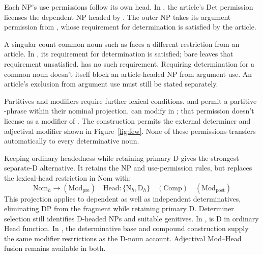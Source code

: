 \documentclass[12pt]{article}
\begin{document}
Each NP's use permissions follow its own head. In , the article's Det permission licenses the dependent NP headed by . The outer NP takes its argument permission from , whose requirement for determination is satisfied by the article.

A singular count common noun such as  faces a different restriction from an article. In , its requirement for determination is satisfied; bare  leaves that requirement unsatisfied.  has no such requirement. Requiring determination for a common noun doesn't itself block an article-headed NP from argument use. An article's exclusion from argument use must still be stated separately.

Partitives and modifiers require further lexical conditions.  and  permit a partitive -phrase within their nominal projection.  can modify  in ; that permission doesn't license  as a modifier of . The construction  permits the external determiner and adjectival modifier shown in Figure~\ref{fig:few}. None of these permissions transfers automatically to every determinative noun.

Keeping ordinary headedness while retaining primary D gives the strongest separate-D alternative. It retains the NP and use-permission rules, but replaces the lexical-head restriction in Nom with:
\[
\mathrm{Nom}_{h}\to(\mathrm{Mod}_{\mathrm{pre}})\quad\mathrm{Head}:\{\mathrm{N}_{h},\mathrm{D}_{h}\}\quad(\mathrm{Comp})\quad(\mathrm{Mod}_{\mathrm{post}})
\]
This projection applies to dependent as well as independent determinatives, eliminating DP from the fragment while retaining primary D. Determiner selection still identifies D-headed NPs and suitable genitives. In ,  is D in ordinary Head function. In , the determinative base and compound construction supply the same modifier restrictions as the D-noun account. Adjectival Mod--Head fusion remains available in both.
\end{document}
